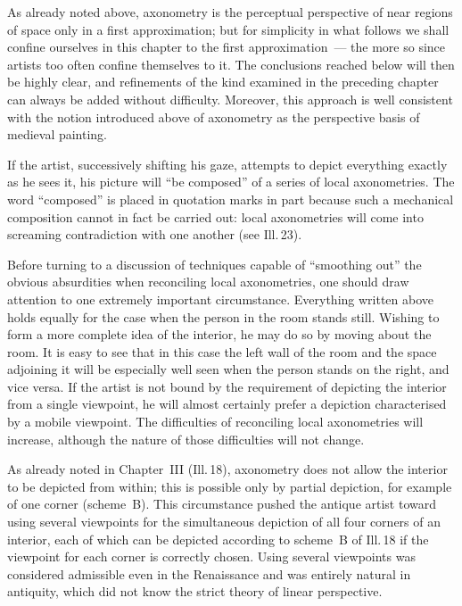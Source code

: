 
As already noted above, axonometry is the perceptual perspective of near regions of
space only in a first approximation; but for simplicity in what follows we shall
confine ourselves in this chapter to the first approximation~--- the more so since
artists too often confine themselves to it.  The conclusions reached below will then
be highly clear, and refinements of the kind examined in the preceding chapter can
always be added without difficulty.  Moreover, this approach is well consistent with
the notion introduced above of axonometry as the perspective basis of medieval
painting.

If the artist, successively shifting his gaze, attempts to depict everything exactly
as he sees it, his picture will ``be composed'' of a series of local axonometries.
The word ``composed'' is placed in quotation marks in part because such a mechanical
composition cannot in fact be carried out: local axonometries will come into
screaming contradiction with one another (see Ill.\,23).

Before turning to a discussion of techniques capable of ``smoothing out'' the obvious
absurdities when reconciling local axonometries, one should draw attention to one
extremely important circumstance.  Everything written above holds equally for the case
when the person in the room stands still.  Wishing to form a more complete idea of
the interior, he may do so by moving about the room.  It is easy to see that in this
case the left wall of the room and the space adjoining it will be especially well seen
when the person stands on the right, and vice versa.  If the artist is not bound by
the requirement of depicting the interior from a single viewpoint, he will almost
certainly prefer a depiction characterised by a mobile viewpoint.  The difficulties
of reconciling local axonometries will increase, although the nature of those
difficulties will not change.

As already noted in Chapter~III (Ill.\,18), axonometry does not allow the interior
to be depicted from within; this is possible only by partial depiction, for example
of one corner (scheme~B).  This circumstance pushed the antique artist toward using
several viewpoints for the simultaneous depiction of all four corners of an interior,
each of which can be depicted according to scheme~B of Ill.\,18 if the viewpoint for
each corner is correctly chosen.  Using several viewpoints was considered admissible
even in the Renaissance and was entirely natural in antiquity, which did not know the
strict theory of linear perspective.

